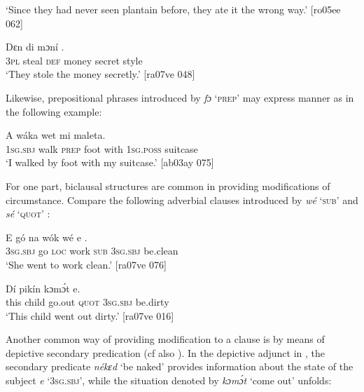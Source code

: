 \glt ‘Since they had never seen plantain before, they ate it the wrong way.’ [ro05ee 062]
\z


\ea%
    \label{ex:key:880}
    \gll Dɛn        di  mɔní    .\\
\textsc{3pl}    steal  \textsc{def}  money  secret  style\\

\glt ‘They stole the money secretly.’ [ra07ve 048]
\z

Likewise, prepositional phrases introduced by \textit{fɔ} ‘\textsc{prep}’ may express manner as in the following example: 


\ea%
    \label{ex:key:881}
    \gll A    wáka        wet    mi    maleta.\\
\textsc{1sg.sbj}  walk  \textsc{prep}  foot    with    \textsc{1sg.poss}  suitcase\\

\glt ‘I walked by foot with my suitcase.’ [ab03ay 075]
\z

For one part, biclausal structures are common in providing modifications of circumstance. Compare the following adverbial clauses introduced by \textit{wé} ‘\textsc{sub}’  and \textit{sé} ‘\textsc{quot}’ : 


\ea%
    \label{ex:key:882}
    \gll E    gó  na  wók    wé  e    .\\
\textsc{3sg.sbj}  go  \textsc{loc}  work  \textsc{sub}  \textsc{3sg.sbj}  be.clean\\

\glt ‘She went to work clean.’ [ra07ve 076]
\z


\ea%
    \label{ex:key:883}
    \gll Dí  pikín  kɔmɔ́t   e.\\
this  child  go.out  \textsc{quot}    \textsc{3sg.sbj}  be.dirty\\

\glt ‘This child went out dirty.’ [ra07ve 016]
\z

Another common way of providing modification to a clause is by means of depictive secondary predication (cf also ). In the depictive adjunct in , the secondary predicate \textit{nékɛd} ‘be naked’ provides information about the state of the subject \textit{e} \textsc{‘3sg.sbj’,} while the situation denoted by \textit{kɔmɔ́t} ‘come out’ unfolds:


